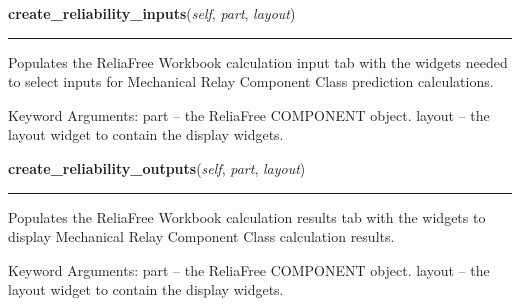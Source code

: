     \label{reliafree:relays:relay:Mechanical:create_reliability_inputs}

    \vspace{0.5ex}

\hspace{.8\funcindent}\begin{boxedminipage}{\funcwidth}

    \raggedright \textbf{create\_reliability\_inputs}(\textit{self}, \textit{part}, \textit{layout})

    \vspace{-1.5ex}

    \rule{\textwidth}{0.5\fboxrule}
\setlength{\parskip}{2ex}
    Populates the ReliaFree Workbook calculation input tab with the widgets
    needed to select inputs for Mechanical Relay Component Class prediction
    calculations.

    Keyword Arguments: part   -- the ReliaFree COMPONENT object. layout -- 
    the layout widget to contain the display widgets.

\setlength{\parskip}{1ex}
    \end{boxedminipage}

    \label{reliafree:relays:relay:Mechanical:create_reliability_outputs}

    \vspace{0.5ex}

\hspace{.8\funcindent}\begin{boxedminipage}{\funcwidth}

    \raggedright \textbf{create\_reliability\_outputs}(\textit{self}, \textit{part}, \textit{layout})

    \vspace{-1.5ex}

    \rule{\textwidth}{0.5\fboxrule}
\setlength{\parskip}{2ex}
    Populates the ReliaFree Workbook calculation results tab with the 
    widgets to display Mechanical Relay Component Class calculation 
    results.

    Keyword Arguments: part   -- the ReliaFree COMPONENT object. layout -- 
    the layout widget to contain the display widgets.

\setlength{\parskip}{1ex}
    \end{boxedminipage}

